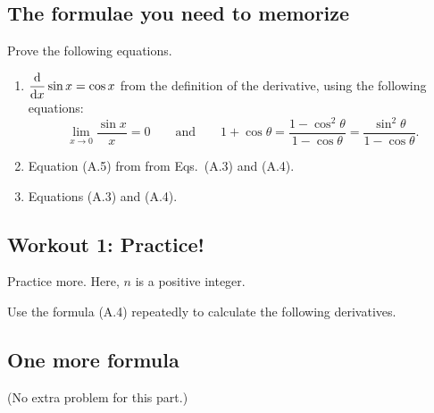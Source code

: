 \documentclass[11pt,pdfa,lastpage]{MishoNote}
\begin{document}
\subsection{The formulae you need to memorize}

\begin{enumerate}[resume]
 \itemC Prove the following equations.
\begin{enumerate}
  \item $\displaystyle\diff{}{x}\sin x=\cos x$ from the definition of the derivative, using the following equations:
\begin{equation*}
  \lim_{x\to 0}\frac{\sin x}{x}=0\qquad\text{and}\qquad1+\cos\theta = \frac{1-\cos^2\theta}{1-\cos\theta} = \frac{\sin^2\theta}{1-\cos\theta}.
\end{equation*}
  \item Equation (A.5) from from Eqs.~(A.3) and (A.4).
  \item Equations (A.3) and (A.4). 
\end{enumerate} 
\end{enumerate}

\newpage

\subsection{Workout 1: Practice!}
\begin{enumerate}[resume]
\itemA Practice more. Here, $n$ is a positive integer.
\begin{menumerate}{3}
\end{menumerate}
\itemB Use the formula (A.4) repeatedly to calculate the following derivatives.
\begin{menumerate}{2}
\end{menumerate}
\end{enumerate}
\subsection{One more formula}
(No extra problem for this part.)
\end{document}
